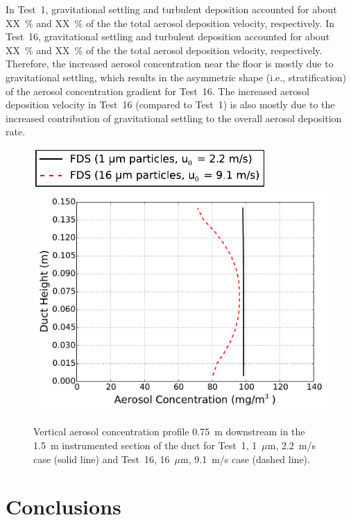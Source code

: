 In Test~1, gravitational settling and turbulent deposition accounted for about XX~\% and XX~\% of the the total aerosol deposition velocity, respectively. In Test~16, gravitational settling and turbulent deposition accounted for about XX~\% and XX~\% of the the total aerosol deposition velocity, respectively. Therefore, the increased aerosol concentration near the floor is mostly due to gravitational settling, which results in the asymmetric shape (i.e., stratification) of the aerosol concentration gradient for Test~16. The increased aerosol deposition velocity in Test~16 (compared to Test~1) is also mostly due to the increased contribution of gravitational settling to the overall aerosol deposition rate.

\begin{figure}[!ht]
\includegraphics[width=3.5in]{Fig_Sippola_Aerosol_Deposition_Transverse_Legend.pdf}
\includegraphics[width=5.0in]{Fig_Sippola_Aerosol_Deposition_Transverse_Concentration.pdf}
\caption[Vertical aerosol concentration profile, Sippola Aerosol Deposition]
{Vertical aerosol concentration profile 0.75~m downstream in the 1.5~m instrumented section of the duct for Test~1, 1~$\mu$m, 2.2~m/s case (solid line) and Test~16, 16~$\mu$m, 9.1~m/s case (dashed line).}
\label{fig:Sippola_Transverse_Concentration}
\end{figure}

\section{Conclusions}
\label{sec:Conclusions}


